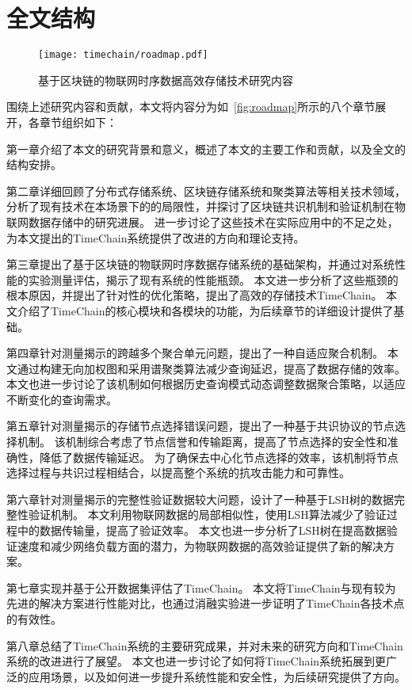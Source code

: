 \section{全文结构}

\begin{figure}[t]
    \centering
    \texttt{[image: timechain/roadmap.pdf]}
    \caption{基于区块链的物联网时序数据高效存储技术研究内容}
    \label{fig:roadmap}
\end{figure}

围绕上述研究内容和贡献，本文将内容分为如~\autoref{fig:roadmap}所示的八个章节展开，各章节组织如下：

第一章介绍了本文的研究背景和意义，概述了本文的主要工作和贡献，以及全文的结构安排。

第二章详细回顾了分布式存储系统、区块链存储系统和聚类算法等相关技术领域，分析了现有技术在本场景下的的局限性，并探讨了区块链共识机制和验证机制在物联网数据存储中的研究进展。
进一步讨论了这些技术在实际应用中的不足之处，为本文提出的TimeChain系统提供了改进的方向和理论支持。

第三章提出了基于区块链的物联网时序数据存储系统的基础架构，并通过对系统性能的实验测量评估，揭示了现有系统的性能瓶颈。
本文进一步分析了这些瓶颈的根本原因，并提出了针对性的优化策略，提出了高效的存储技术TimeChain。
本文介绍了TimeChain的核心模块和各模块的功能，为后续章节的详细设计提供了基础。

第四章针对测量揭示的跨越多个聚合单元问题，提出了一种自适应聚合机制。
本文通过构建无向加权图和采用谱聚类算法减少查询延迟，提高了数据存储的效率。
本文也进一步讨论了该机制如何根据历史查询模式动态调整数据聚合策略，以适应不断变化的查询需求。

第五章针对测量揭示的存储节点选择错误问题，提出了一种基于共识协议的节点选择机制。
该机制综合考虑了节点信誉和传输距离，提高了节点选择的安全性和准确性，降低了数据传输延迟。
为了确保去中心化节点选择的效率，该机制将节点选择过程与共识过程相结合，以提高整个系统的抗攻击能力和可靠性。

第六章针对测量揭示的完整性验证数据较大问题，设计了一种基于LSH树的数据完整性验证机制。
本文利用物联网数据的局部相似性，使用LSH算法减少了验证过程中的数据传输量，提高了验证效率。
本文也进一步分析了LSH树在提高数据验证速度和减少网络负载方面的潜力，为物联网数据的高效验证提供了新的解决方案。

第七章实现并基于公开数据集评估了TimeChain。
本文将TimeChain与现有较为先进的解决方案进行性能对比，也通过消融实验进一步证明了TimeChain各技术点的有效性。

第八章总结了TimeChain系统的主要研究成果，并对未来的研究方向和TimeChain系统的改进进行了展望。
本文也进一步讨论了如何将TimeChain系统拓展到更广泛的应用场景，以及如何进一步提升系统性能和安全性，为后续研究提供了方向。

